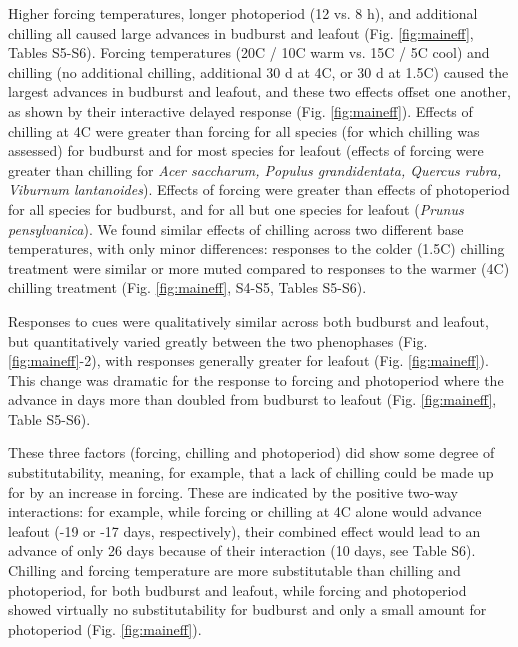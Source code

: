 \documentclass[11pt]{article}
\begin{document}
Higher forcing temperatures, longer photoperiod (12 vs. 8 h), and additional chilling all caused large advances in budburst and leafout (Fig. \ref{fig:maineff}, Tables S5-S6). Forcing temperatures (20\degree C / 10\degree C warm vs. 15\degree C / 5\degree C cool) and chilling (no additional chilling,  additional 30 d at 4\degree C, or 30 d at 1.5\degree C) caused the largest advances in budburst and leafout, and these two effects offset one another, as shown by their interactive delayed response (Fig. \ref{fig:maineff}). Effects of chilling at 4\degree C were greater than forcing for all species (for which chilling was assessed) for budburst and for most species for leafout (effects of forcing were greater than chilling for \emph{Acer saccharum, Populus grandidentata, Quercus rubra, Viburnum lantanoides}). Effects of forcing were greater than effects of photoperiod for all species for budburst, and for all but one species for leafout (\emph{Prunus pensylvanica}). We found similar effects of chilling across two different base temperatures, with only minor differences: responses to the colder (1.5\degree C) chilling treatment were similar or more muted compared to responses to the warmer  (4\degree C) chilling treatment (Fig. \ref{fig:maineff}, S4-S5, Tables S5-S6). 

Responses to cues were qualitatively similar across both budburst and leafout, but quantitatively varied greatly between the two phenophases (Fig. \ref{fig:maineff}-2), with responses generally greater for leafout (Fig. \ref{fig:maineff}). This change was dramatic for the response to forcing and photoperiod where the advance in days more than doubled from budburst to leafout (Fig. \ref{fig:maineff}, Table S5-S6).

These three factors (forcing, chilling and photoperiod) did show some degree of substitutability, meaning, for example, that a lack of chilling could be made up for by an increase in forcing. These are indicated by the positive two-way interactions: for example, while forcing or chilling at 4\degree C alone would advance leafout (-19 or -17 days, respectively), their combined effect would lead to an advance of only 26 days because of their interaction (10 days, see Table S6). Chilling and forcing temperature are more substitutable than chilling and photoperiod, for both budburst and leafout, while forcing and photoperiod showed virtually no substitutability for budburst and only a small amount for photoperiod (Fig. \ref{fig:maineff}).
\end{document}

